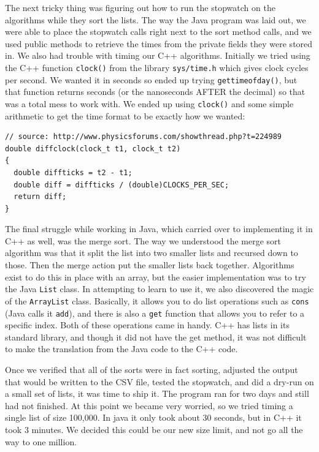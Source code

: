 \documentclass[12pt]{amsart}
\begin{document}
The next tricky thing was figuring out how to run the stopwatch on the 
algorithms while they sort the lists. The way the Java program was laid out, we were able to place the stopwatch calls right next to the sort method calls, and we used public methods to retrieve the times from the private fields they were stored in. We also had trouble with timing our C++ algorithms. Initially we tried using the C++ function \texttt{clock()} from the library \texttt{sys/time.h} which gives clock cycles per second. We wanted it in seconds so ended up trying \texttt{gettimeofday()}, but that function returns seconds (or the nanoseconds AFTER the decimal) so that was a total mess to work with. We ended up using \texttt{clock()} and some simple arithmetic to get the time format to be exactly how we wanted:
\linespread{1}
\begin{verbatim}
// source: http://www.physicsforums.com/showthread.php?t=224989
double diffclock(clock_t t1, clock_t t2)
{
  double diffticks = t2 - t1;
  double diff = diffticks / (double)CLOCKS_PER_SEC;
  return diff;
}
\end{verbatim}
\linespread{1.5}
The final struggle while working in Java, which carried over to implementing it
in C++ as well, was the merge sort. The way we understood the merge sort algorithm
was that it split the list into two smaller lists and recursed down to those. Then
the merge action put the smaller lists back together. Algorithms exist to do this in
place with an array, but the easier implementation was to try the Java \texttt{List} class.
In attempting to learn to use it, we also discovered the magic of the \texttt{ArrayList} class. Basically, it
allows you to do list operations such as \texttt{cons} (Java calls it \texttt{add}), and there is also
a \texttt{get} function that allows you to refer to a specific index. Both of these
operations came in handy. C++ has lists in its standard library, and though it
did not have the get method, it was not difficult to make the translation from
the Java code to the C++ code.

Once we verified that all of the sorts were in fact sorting, adjusted the output
that would be written to the CSV file, tested the stopwatch, and did a dry-run
on a small set of lists, it was time to ship it. The program ran for two days
and still had not finished. At this point we became very worried, so we tried
timing a single list of size 100,000. In java it only took about 30 seconds, but
in C++ it took 3 minutes. We decided this could be our new size limit, and not
go all the way to one million.
\end{document}
